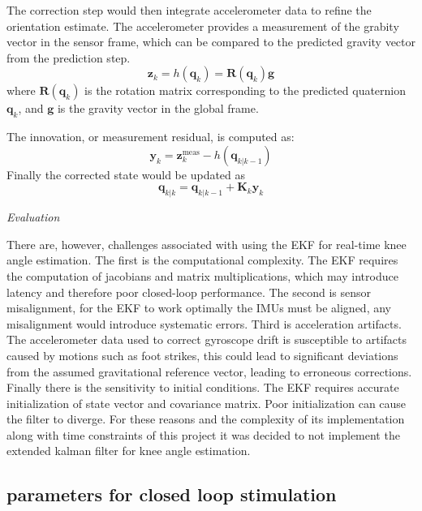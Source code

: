 The correction step would then integrate accelerometer data to refine the orientation estimate. The accelerometer provides a measurement of the grabity vector in the sensor frame, which can be compared to the predicted gravity vector from the prediction step.
\[
\mathbf{z}_k = h(\mathbf{q}_k) = \mathbf{R}(\mathbf{q}_k) \mathbf{g}
\]
where \( \mathbf{R}(\mathbf{q}_k) \) is the rotation matrix corresponding to the predicted quaternion \( \mathbf{q}_k \), and \( \mathbf{g} \) is the gravity vector in the global frame.

The innovation, or measurement residual, is computed as:
\[
\mathbf{y}_k = \mathbf{z}_k^{\text{meas}} - h(\mathbf{q}_{k|k-1})
\]
Finally the corrected state would be updated as 
\[
\mathbf{q}_{k|k} = \mathbf{q}_{k|k-1} + \mathbf{K}_k \mathbf{y}_k
\]




\textit{Evaluation}

There are, however, challenges associated with using the EKF for real-time knee angle estimation. The first is the computational complexity. The EKF requires the computation of jacobians and matrix multiplications, which may introduce latency and therefore poor closed-loop performance. The second is sensor misalignment, for the EKF to work optimally the IMUs must be aligned, any misalignment would introduce systematic errors. Third is acceleration artifacts. The accelerometer data used to correct gyroscope drift is susceptible to artifacts caused by motions such as foot strikes, this could lead to significant deviations from the assumed gravitational reference vector, leading to erroneous corrections. Finally there is the sensitivity to initial conditions. The EKF requires accurate initialization of state vector and covariance matrix. Poor initialization can cause the filter to diverge. For these reasons and the complexity of its implementation along with time constraints of this project it was decided to not implement the extended kalman filter for knee angle estimation.

\subsection{parameters for closed loop stimulation}



